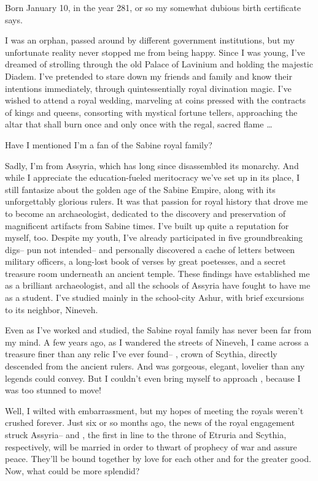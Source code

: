 \documentclass[char]{Kos}
\begin{document}
\name{\cArchaeologist{}}

Born January 10, in the year 281, or so my somewhat dubious birth certificate says.

I was an orphan, passed around by different government institutions, but my unfortunate reality never stopped me from being happy. Since I was young, I've dreamed of strolling through the old Palace of Lavinium and holding the majestic Diadem. I've pretended to stare down my friends and family and know their intentions immediately, through quintessentially royal divination magic. I've wished to attend a royal wedding, marveling at coins pressed with the contracts of kings and queens, consorting with mystical fortune tellers, approaching the altar that shall burn once and only once with the regal, sacred flame \ldots{}

Have I mentioned I'm a fan of the Sabine royal family?

Sadly, I'm from Assyria, which has long since disassembled its monarchy. And while I appreciate the education-fueled meritocracy we've set up in its place, I still fantasize about the golden age of the Sabine Empire, along with its unforgettably glorious rulers. It was that passion for royal history that drove me to become an archaeologist, dedicated to the discovery and preservation of magnificent artifacts from Sabine times. I've built up quite a reputation for myself, too. Despite my youth, I've already participated in five groundbreaking digs-- pun not intended-- and personally discovered a cache of letters between military officers, a long-lost book of verses by great poetesses, and a secret treasure room underneath an ancient temple. These findings have established me as a brilliant archaeologist, and all the schools of Assyria have fought to have me as a student. I've studied mainly in the school-city Ashur, with brief excursions to its neighbor, Nineveh.

Even as I've worked and studied, the Sabine royal family has never been far from my mind. A few years ago, as I wandered the streets of Nineveh, I came across a treasure finer than any relic I've ever found-- \cBride{\intro}, crown \cBride{\prince} of Scythia, directly descended from the ancient rulers. And \cBride{\they} was gorgeous, elegant, lovelier than any legends could convey. But I couldn't even bring myself to approach \cBride{\them}, because I was too stunned to move!

Well, I wilted with embarrassment, but my hopes of meeting the royals weren't crushed forever. Just six or so months ago, the news of the royal engagement struck Assyria-- \cBride{} and \cGroom{}, the first in line to the throne of Etruria and Scythia, respectively, will be married in order to thwart of prophecy of war and assure peace. They'll be bound together by love for each other and for the greater good. Now, what could be more splendid?
\end{document}
